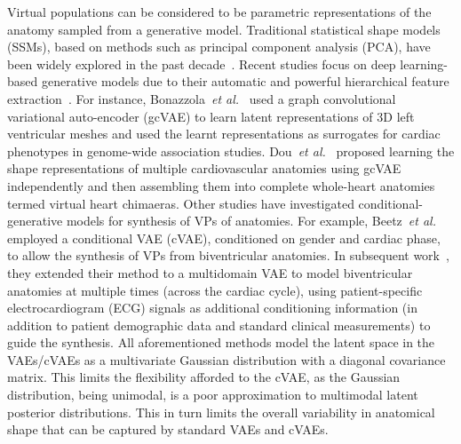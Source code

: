 \documentclass[runningheads]{llncs}
\begin{document}
Virtual populations can be considered to be parametric representations of the anatomy sampled from a generative model. Traditional statistical shape models (SSMs), based on methods such as principal component analysis (PCA), have been widely explored in the past decade~\cite{frangi2002automatic,gooya2015bayesian,ravikumar2018group}. Recent studies focus on deep learning-based generative models due to their automatic and powerful hierarchical feature extraction~\cite{bonazzola2021image,dou2022generative}. For instance, Bonazzola~\textit{et al.}~\cite{bonazzola2021image} used a graph convolutional variational auto-encoder (gcVAE) to learn latent representations of 3D left ventricular meshes and used the learnt representations as surrogates for cardiac phenotypes in genome-wide association studies. Dou~\textit{et al.}~\cite{dou2022generative} proposed learning the shape representations of multiple cardiovascular anatomies using gcVAE independently and then assembling them into complete whole-heart anatomies termed virtual heart chimaeras. Other studies have investigated conditional-generative models for synthesis of VPs of anatomies. For example, Beetz~\textit{et al.}~\cite{beetz2022generating} employed a conditional VAE (cVAE), conditioned on gender and cardiac phase, to allow the synthesis of VPs from biventricular anatomies. In subsequent work~\cite{beetz2022multi,li2023deep}, they extended their method to a multidomain VAE to model biventricular anatomies at multiple times (across the cardiac cycle), using patient-specific electrocardiogram (ECG) signals as additional conditioning information (in addition to patient demographic data and standard clinical measurements) to guide the synthesis.  
All aforementioned methods model the latent space in the VAEs/cVAEs as a multivariate Gaussian distribution with a diagonal covariance matrix. This limits the flexibility afforded to the cVAE, as the Gaussian distribution, being unimodal, is a poor approximation to multimodal latent posterior distributions. This in turn limits the overall variability in anatomical shape that can be captured by standard VAEs and cVAEs. 
\end{document}
